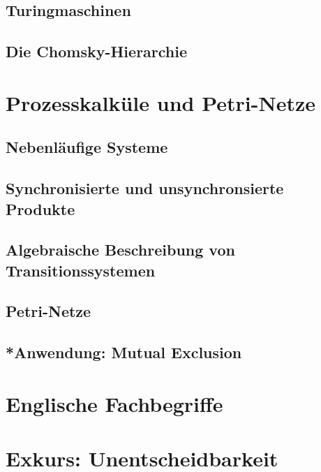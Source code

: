 \documentclass[11pt, a4paper]{article}
\theoremstyle{definition}
\theoremstyle{plain}
\numberwithin{equation}{section}
\begin{document}
\subsection{Turingmaschinen}\label{sec:grammars_tm}


\subsection{Die Chomsky-Hierarchie}\label{sec:grammars_chomsky}



\newpage
\section{Prozesskalküle und Petri-Netze}\label{sec:process}
\subsection{Nebenläufige Systeme}\label{sec:process_concurring}


\subsection{Synchronisierte und unsynchronsierte Produkte}\label{sec:process_products}


\subsection{Algebraische Beschreibung von Transitionssystemen}\label{sec:process_algebraic}


\subsection{Petri-Netze}\label{sec:process_petrinets}


\subsection{*Anwendung: Mutual Exclusion}\label{sec:process_peterson}



\newpage
{}
\nocite{*}




\newpage
\begin{appendix}
\section{Englische Fachbegriffe}


\newpage
\section{Exkurs: Unentscheidbarkeit}
\end{appendix}

\end{document}
